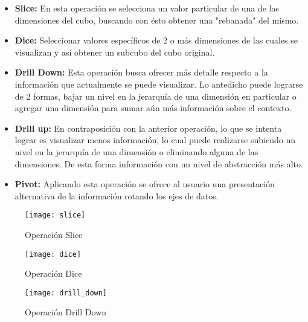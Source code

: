\documentclass[a4paper,11pt]{article}
\begin{document}
    \begin{itemize}
      \item \textbf{Slice:} En esta operación se selecciona un valor particular de una de las dimensiones del cubo, buscando con ésto obtener una "rebanada" del
      mismo.
      \item \textbf{Dice:} Seleccionar valores específicos de 2 o más dimensiones de las cuales se visualizan y así obtener un subcubo del cubo original.
      \item \textbf{Drill Down:} Esta operación busca ofrecer más detalle respecto a la información que actualmente se puede visualizar. Lo antedicho puede
      lograrse de 2 formas, bajar un nivel en la jerarquía de una dimensión en particular o agregar una dimensión para sumar aún más información sobre el contexto.
      \item \textbf{Drill up:} En contraposición con la anterior operación, lo que se intenta lograr es visualizar menos información, lo cual puede realizarse
      subiendo un nivel en la jerarquía de una dimensión o eliminando alguna de las dimensiones. De esta forma información con un nivel de abstracción más alto.
      \item \textbf{Pivot:} Aplicando esta operación se ofrece al usuario una presentación alternativa de la información rotando los ejes de datos.
    \end{itemize}
    
    \begin{figure}
      \begin{center}
        \texttt{[image: slice]}
        \caption{Operación Slice} \cite{operaciones}
        \label{slice}
      \end{center}
    \end{figure}
    
    \begin{figure}
      \begin{center}
        \texttt{[image: dice]}
        \caption{Operación Dice} \cite{operaciones}
        \label{dice}
      \end{center}
    \end{figure}
    
    \begin{figure}
      \begin{center}
        \texttt{[image: drill\_down]}
        \caption{Operación Drill Down} \cite{operaciones}
        \label{drill_down}
      \end{center}
    \end{figure}
    
\end{document}
